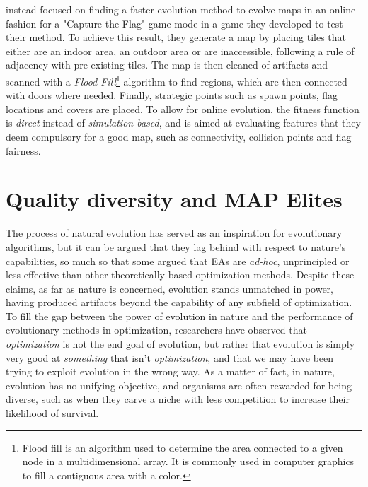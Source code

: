 \documentclass{Configuration_Files/PoliMi3i_thesis}
\begin{document}
\citeauthor{bhojan_arena_2014} instead focused on finding a faster evolution method to evolve maps in an online fashion for a "Capture the Flag" game mode in a game they developed to test their method. 
To achieve this result, they generate a map by placing tiles that either are an indoor area, an outdoor area or are inaccessible, following a rule of adjacency with pre-existing tiles. 
The map is then cleaned of artifacts and scanned with a \textit{Flood Fill}\footnote{Flood fill is an algorithm used to determine the area connected to a given node in a multidimensional array. It is commonly used in computer graphics to fill a contiguous area with a color.} algorithm to find regions, which are then connected with doors where needed. Finally, strategic points such as spawn points, flag locations and covers are placed. To allow for online evolution, the fitness function is \textit{direct} instead of \textit{simulation-based}, and is aimed at evaluating features that they deem compulsory for a good map, such as connectivity, collision points and flag fairness. \cite{bhojan_arena_2014}


\section{Quality diversity and MAP Elites}
The process of natural evolution has served as an inspiration for evolutionary algorithms, but it can be argued that they lag behind with respect to nature's capabilities, so much so that some argued that EAs are \textit{ad-hoc}, unprincipled or less effective than other theoretically based optimization methods. Despite these claims, as far as nature is concerned, evolution stands unmatched in power, having produced artifacts beyond the capability of any subfield of optimization. To fill the gap between the power of evolution in nature and the performance of evolutionary methods in optimization, researchers have observed that \textit{optimization} is not the end goal of evolution, but rather that evolution is simply very good at \textit{something} that isn't \textit{optimization}, and that we may have been trying to exploit evolution in the wrong way. As a matter of fact, in nature, evolution has no unifying objective, and organisms are often rewarded for being diverse, such as when they carve a niche with less competition to increase their likelihood of survival. \cite{pugh_quality_2016}
\end{document}
